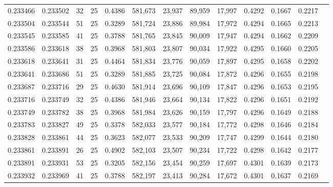 \begin{tabular}{rrrrrrrrrrrrr}
0.233466 & 0.233502 &    32 &  25 &                                     0.4386 & 581,673 &  23,937 &  89,959 &  17,997 & 0.4292 & 0.1667 & 0.2217 \\
0.233504 & 0.233544 &    51 &  25 &                                     0.3289 & 581,724 &  23,886 &  89,984 &  17,972 & 0.4294 & 0.1665 & 0.2213 \\
0.233545 & 0.233585 &    41 &  25 &                                     0.3788 & 581,765 &  23,845 &  90,009 &  17,947 & 0.4294 & 0.1662 & 0.2209 \\
0.233586 & 0.233618 &    38 &  25 &                                     0.3968 & 581,803 &  23,807 &  90,034 &  17,922 & 0.4295 & 0.1660 & 0.2205 \\
0.233618 & 0.233641 &    31 &  25 &                                     0.4464 & 581,834 &  23,776 &  90,059 &  17,897 & 0.4295 & 0.1658 & 0.2202 \\
0.233641 & 0.233686 &    51 &  25 &                                     0.3289 & 581,885 &  23,725 &  90,084 &  17,872 & 0.4296 & 0.1655 & 0.2198 \\
0.233687 & 0.233716 &    29 &  25 &                                     0.4630 & 581,914 &  23,696 &  90,109 &  17,847 & 0.4296 & 0.1653 & 0.2195 \\
0.233716 & 0.233749 &    32 &  25 &                                     0.4386 & 581,946 &  23,664 &  90,134 &  17,822 & 0.4296 & 0.1651 & 0.2192 \\
0.233749 & 0.233782 &    38 &  25 &                                     0.3968 & 581,984 &  23,626 &  90,159 &  17,797 & 0.4296 & 0.1649 & 0.2188 \\
0.233783 & 0.233827 &    49 &  25 &                                     0.3378 & 582,033 &  23,577 &  90,184 &  17,772 & 0.4298 & 0.1646 & 0.2184 \\
0.233828 & 0.233861 &    44 &  25 &                                     0.3623 & 582,077 &  23,533 &  90,209 &  17,747 & 0.4299 & 0.1644 & 0.2180 \\
0.233861 & 0.233891 &    26 &  25 &                                     0.4902 & 582,103 &  23,507 &  90,234 &  17,722 & 0.4298 & 0.1642 & 0.2177 \\
0.233891 & 0.233931 &    53 &  25 &                                     0.3205 & 582,156 &  23,454 &  90,259 &  17,697 & 0.4301 & 0.1639 & 0.2173 \\
0.233932 & 0.233969 &    41 &  25 &                                     0.3788 & 582,197 &  23,413 &  90,284 &  17,672 & 0.4301 & 0.1637 & 0.2169 \\

\end{tabular}
